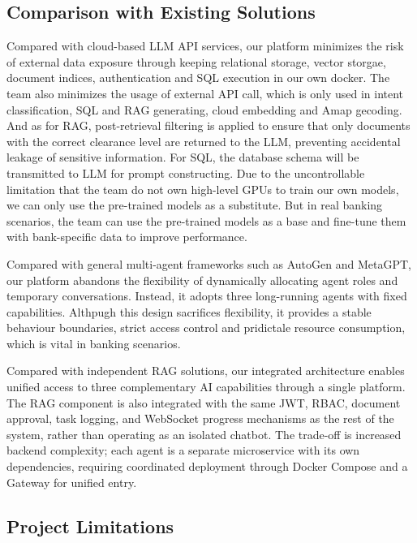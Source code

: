 \subsection{Comparison with Existing Solutions}

Compared with cloud-based LLM API services, our platform minimizes the risk of external data exposure through keeping relational storage, vector storgae, document indices, authentication and SQL execution in our own docker. The team also minimizes the usage of external API call, which is only used in intent classification, SQL and RAG generating, cloud embedding and Amap gecoding. And as for RAG, post-retrieval filtering is applied to ensure that only documents with the correct clearance level are returned to the LLM, preventing accidental leakage of sensitive information. For SQL, the database schema will be transmitted to LLM for prompt constructing. Due to the uncontrollable limitation that the team do not own high-level GPUs to train our own models, we can only use the pre-trained models as a substitute. But in real banking scenarios, the team can use the pre-trained models as a base and fine-tune them with bank-specific data to improve performance.

Compared with general multi-agent frameworks such as AutoGen and MetaGPT, our platform abandons the flexibility of dynamically allocating agent roles and temporary conversations. Instead, it adopts three long-running agents with fixed capabilities. Althpugh this design sacrifices flexibility, it provides a stable behaviour boundaries, strict access control and pridictale resource consumption, which is vital in banking scenarios.

Compared with independent RAG solutions, our integrated architecture enables unified access to three complementary AI capabilities through a single platform. The RAG component is also integrated with the same JWT, RBAC, document approval, task logging, and WebSocket progress mechanisms as the rest of the system, rather than operating as an isolated chatbot. The trade-off is increased backend complexity; each agent is a separate microservice with its own dependencies, requiring coordinated deployment through Docker Compose and a Gateway for unified entry.

\subsection{Project Limitations}

